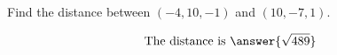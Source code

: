\documentclass{ximera}
\author{Bart Snapp}
\begin{document}
\begin{exercise}
  Find the distance between $(-4,10,-1)$ and $(10,-7,1)$.
  \begin{prompt}
  \[
  \text{The distance is }\answer{\sqrt{489}}
  \]
  \end{prompt}
\end{exercise}
\end{document}
